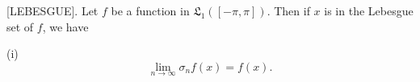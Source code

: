 [LEBESGUE]. Let $f$ be a function in $\mathfrak{L}_1([-\pi, \pi])$. Then if $x$ is in the Lebesgue set of $f$, we have

(i) $$\lim_{n \to \infty} \sigma_n f(x) = f(x).$$